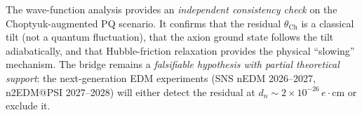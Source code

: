 \begin{verdict}
The wave-function analysis provides an \emph{independent consistency
check} on the Choptyuk-augmented PQ scenario.  It confirms that
the residual $\theta_\mathrm{Ch}$ is a classical tilt (not a
quantum fluctuation), that the axion ground state follows the tilt
adiabatically, and that Hubble-friction relaxation provides the
physical ``slowing'' mechanism.  The bridge remains a
\emph{falsifiable hypothesis with partial theoretical support}:
the next-generation EDM experiments (SNS nEDM 2026--2027,
n2EDM@PSI 2027--2028) will either detect the residual at
$d_n \sim 2 \times 10^{-26}\,e\cdot\mathrm{cm}$ or exclude it.
\end{verdict}

